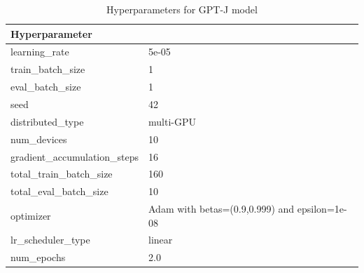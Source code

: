 \begin{table}
    \def\arraystretch{1.5}
    \small
    \centering
    \caption{Hyperparameters for GPT-J model}
    \label{tab:model-hyperparameters}
    \begin{tabularx}{\textwidth}{XX}
        \toprule
        \textbf{Hyperparameter} & \\
        \midrule
        learning\_rate & 5e-05\\
        train\_batch\_size & 1\\
        eval\_batch\_size & 1\\
        seed & 42\\
        distributed\_type & multi-GPU\\
        num\_devices & 10\\
        gradient\_accumulation\_steps & 16\\
        total\_train\_batch\_size & 160\\
        total\_eval\_batch\_size & 10\\
        optimizer & Adam with betas=(0.9,0.999) and epsilon=1e-08\\
        lr\_scheduler\_type & linear\\
        num\_epochs & 2.0\\
        \bottomrule
    \end{tabularx}
\end{table}
